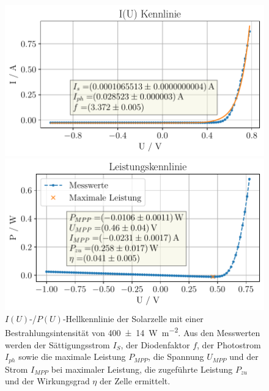 \documentclass[english, ngerman]{scrartcl}
\begin{document}
\setcaphanging
%
\setcapindent{0pt}
\begin{figure}[H]
    \centering
    \begin{minipage}[t]{0.485\linewidth}
        \centering
        \includegraphics[width=\linewidth]{fig/plots/400_UI.pdf}
    \end{minipage}%
    \hspace*{\fill}
    \begin{minipage}[t]{0.485\linewidth}
        \centering
        \includegraphics[width=\linewidth]{fig/plots/400_P.pdf}
    \end{minipage}
    \caption[$I(U)$-/$P(U)$-Hellkennlinie Solarzelle -- Sonnensimulator]{$I(U)$-/$P(U)$-Hellkennlinie der Solarzelle mit einer Bestrahlungsintensität von \SI{400(14)}{\watt\per\meter\squared}. Aus den Messwerten werden der Sättigungsstrom $I_S$, der Diodenfaktor $f$, der Photostrom $I_{ph}$ sowie die maximale Leistung $P_{MPP}$, die Spannung $U_{MPP}$ und der Strom $I_{MPP}$ bei maximaler Leistung, die zugeführte Leistung $P_{zu}$ und der Wirkungsgrad $\eta$ der Zelle ermittelt.}
    \label{fig:solar_Hell_400}
\end{figure}
\end{document}

